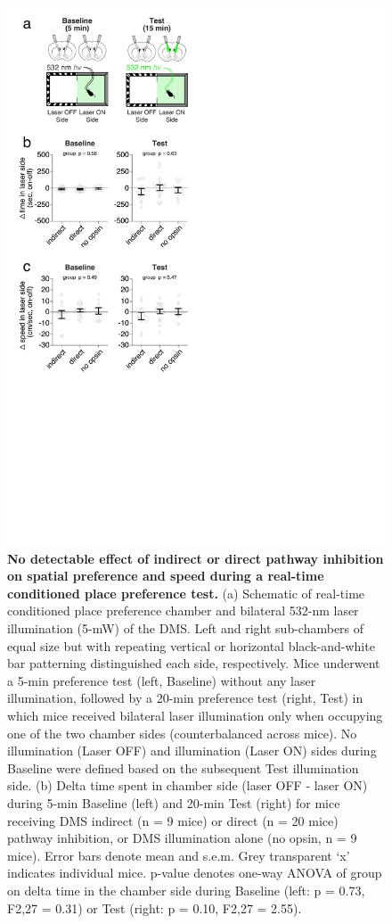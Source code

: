 \begin{figure}[t!]
  \begin{center}
    \includegraphics[width=0.47\linewidth]{ch7-appendix1/appendix1-figures/Supplementary_Fig3.pdf}
    \caption[No detectable effect of indirect or direct pathway inhibition on spatial preference and speed during a real-time conditioned place preference test]{\textbf{No detectable effect of indirect or direct pathway inhibition on spatial preference and speed during a real-time conditioned place preference test.} (a) Schematic of real-time conditioned place preference chamber and bilateral 532-nm laser illumination (5-mW) of the DMS. Left and right sub-chambers of equal size but with repeating vertical or horizontal black-and-white bar patterning distinguished each side, respectively. Mice underwent a 5-min preference test (left, Baseline) without any laser illumination, followed by a 20-min preference test (right, Test) in which mice received bilateral laser illumination only when occupying one of the two chamber sides (counterbalanced across mice). No illumination (Laser OFF) and illumination (Laser ON) sides during Baseline were defined based on the subsequent Test illumination side. (b) Delta time spent in chamber side (laser OFF - laser ON) during 5-min Baseline (left) and 20-min Test (right) for mice receiving DMS indirect (n = 9 mice) or direct (n = 20 mice) pathway inhibition, or DMS illumination alone (no opsin, n = 9 mice). Error bars denote mean and s.e.m. Grey transparent ‘x’ indicates individual mice. p-value denotes one-way ANOVA of group on delta time in the chamber side during Baseline (left: p = 0.73, F2,27 = 0.31) or Test (right: p = 0.10, F2,27 = 2.55).}
    \label{fig:ap1:supp3}
  \end{center}
\end{figure}
